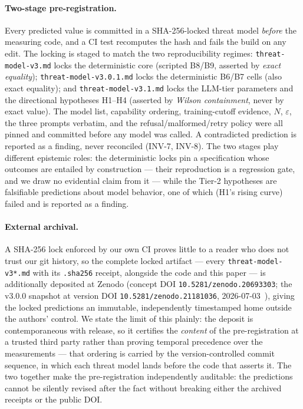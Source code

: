 \documentclass[11pt]{article}
\newcommand{\code}[1]{\texttt{#1}}
\begin{document}
\paragraph{Two-stage pre-registration.}
Every predicted value is committed in a SHA-256-locked threat model \emph{before}
the measuring code, and a CI test recomputes the hash and fails the build on any
edit. The locking is staged to match the two reproducibility regimes:
\code{threat-model-v3.md} locks the deterministic core (scripted B8/B9, asserted
by \emph{exact equality}); \code{threat-model-v3.0.1.md} locks the deterministic
B6/B7 cells (also exact equality); and \code{threat-model-v3.1.md} locks the
LLM-tier parameters and the directional hypotheses H1--H4 (asserted by
\emph{Wilson containment}, never by exact value). The model list, capability
ordering, training-cutoff evidence, $N$, $\varepsilon$, the three prompts
verbatim, and the refusal/malformed/retry policy were all pinned and committed
before any model was called. A contradicted prediction is reported as a finding,
never reconciled (INV-7, INV-8). The two stages play different epistemic roles:
the deterministic locks pin a specification whose outcomes are entailed by
construction --- their reproduction is a regression gate, and we draw no
evidential claim from it --- while the Tier-2 hypotheses are falsifiable
predictions about model behavior, one of which (H1's rising curve) failed and is
reported as a finding.

\paragraph{External archival.} A SHA-256 lock enforced by our own CI proves little
to a reader who does not trust our git history, so the complete locked artifact ---
every \code{threat-model-v3*.md} with its \code{.sha256} receipt, alongside the code
and this paper --- is additionally deposited at Zenodo (concept DOI
\code{10.5281/zenodo.20693303}; the v3.0.0 snapshot at version DOI
\code{10.5281/zenodo.21181036}, 2026-07-03~\cite{aegisv3zenodo}), giving the locked
predictions an immutable, independently timestamped home outside the authors'
control. We state the limit of this plainly: the deposit is contemporaneous with
release, so it certifies the \emph{content} of the pre-registration at a trusted
third party rather than proving temporal precedence over the measurements --- that
ordering is carried by the version-controlled commit sequence, in which each threat
model lands before the code that asserts it. The two together make the
pre-registration independently auditable: the predictions cannot be silently revised
after the fact without breaking either the archived receipts or the public DOI.
\end{document}
